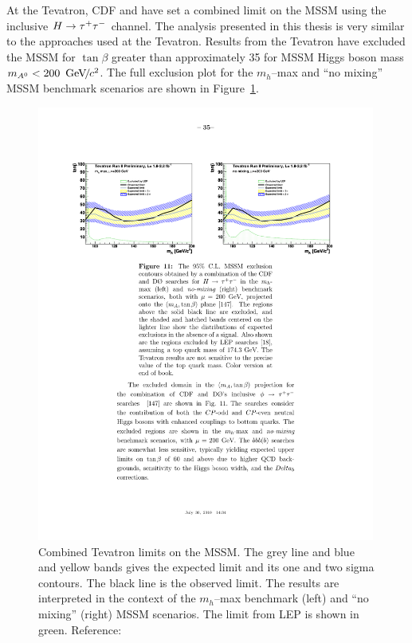 At the Tevatron, CDF and \DZERO have set a combined limit on the MSSM using the
inclusive $H\to\tau^+\tau^-$ channel.  The analysis presented in this thesis is very  
similar to the approaches used at the Tevatron.  Results from the Tevatron have
excluded the MSSM for $\tan\beta$ greater than approximately 35 for MSSM Higgs
boson mass $m_{A^0} < 200~{\,\text{Ge\hspace{-.08em}V\hspace{-0.16em}/\hspace{-0.08em}}c^\text{2}}$.   The full
exclusion plot for the \mbox{$m_h$--max} and ``no mixing'' MSSM benchmark
scenarios are shown in Figure~\ref{fig:TevMSSMLimits}.
\begin{figure}
  \centering
  \includegraphics[width=0.99\textwidth]{theory_chapter/figures/tev_mssm_limits_mhmax_and_nomixing.pdf}
  \caption[Tevatron MSSM exclusion limits]{Combined Tevatron limits on the
  MSSM\@.  The grey line and blue and yellow bands gives the expected limit and
  its one and two sigma contours.  The black line is the observed limit.
  The results are interpreted in the context of the \mbox{$m_h$--max}
  benchmark (left) and ``no mixing'' (right) MSSM scenarios.  The limit from LEP
  is shown in green.
  Reference:~\cite{PDG}} \label{fig:TevMSSMLimits}
\end{figure}

